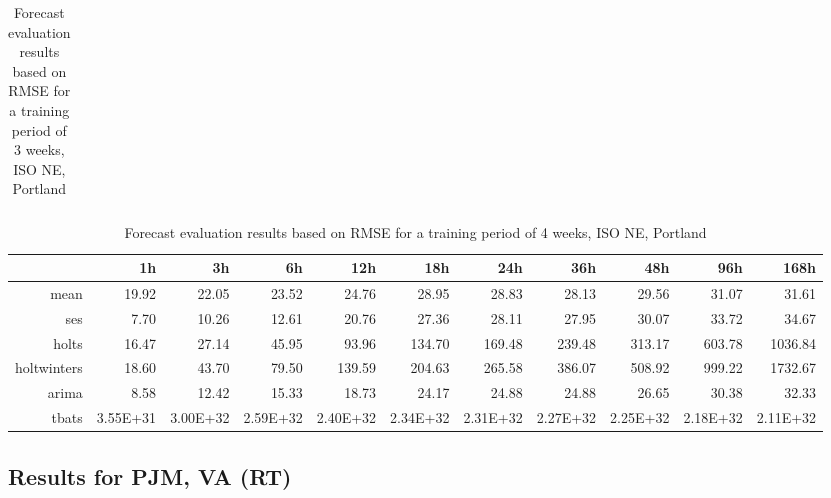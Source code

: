 \begin{landscape}
\begin{table}[ht]
\begin{tabular}{rrrrrrrrrrr}
   \hline
\end{tabular}
\caption{Forecast evaluation results based on RMSE for a training period of 3 weeks, ISO NE, Portland}
\label{tab:app_results_portland_3weeks}
\end{table}
\begin{table}[ht]
\centering
\begin{tabular}{rrrrrrrrrrr}
  \hline
 & 1h & 3h & 6h & 12h & 18h & 24h & 36h & 48h & 96h & 168h \\ 
  \hline
mean & 19.92 & 22.05 & 23.52 & 24.76 & 28.95 & 28.83 & 28.13 & 29.56 & 31.07 & 31.61 \\ 
  ses & 7.70 & 10.26 & 12.61 & 20.76 & 27.36 & 28.11 & 27.95 & 30.07 & 33.72 & 34.67 \\ 
  holts & 16.47 & 27.14 & 45.95 & 93.96 & 134.70 & 169.48 & 239.48 & 313.17 & 603.78 & 1036.84 \\ 
  holtwinters & 18.60 & 43.70 & 79.50 & 139.59 & 204.63 & 265.58 & 386.07 & 508.92 & 999.22 & 1732.67 \\ 
  arima & 8.58 & 12.42 & 15.33 & 18.73 & 24.17 & 24.88 & 24.88 & 26.65 & 30.38 & 32.33 \\ 
  tbats & 3.55E+31 & 3.00E+32 & 2.59E+32 & 2.40E+32 & 2.34E+32 & 2.31E+32 & 2.27E+32 & 2.25E+32 & 2.18E+32 & 2.11E+32 \\ 
   \hline
\end{tabular}
\caption{Forecast evaluation results based on RMSE for a training period of 4 weeks, ISO NE, Portland}
\label{tab:app_results_portland_4weeks}
\vspace*{-0.4in}
\end{table}




\subsection{Results for PJM, VA (RT)}




\end{landscape}
